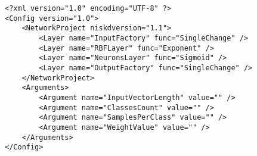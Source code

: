 \begin{verbatim}
<?xml version="1.0" encoding="UTF-8" ?>
<Config version="1.0">
    <NetworkProject niskdversion="1.1">
        <Layer name="InputFactory" func="SingleChange" />
        <Layer name="RBFLayer" func="Exponent" />
        <Layer name="NeuronsLayer" func="Sigmoid" />
        <Layer name="OutputFactory" func="SingleChange" />
    </NetworkProject>
    <Arguments>
        <Argument name="InputVectorLength" value="" />
        <Argument name="ClassesCount" value="" />
        <Argument name="SamplesPerClass" value="" />
        <Argument name="WeightValue" value="" />
    </Arguments>
</Config>
\end{verbatim}
